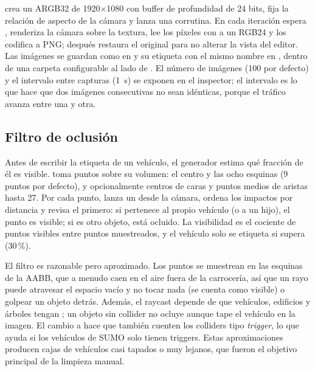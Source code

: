 \documentclass[11pt,a4paper]{article}
\begin{document}
 crea un  ARGB32 de 1920$\times$1080 con buffer de profundidad de 24 bits, fija la relación de aspecto de la cámara y lanza una corrutina. En cada iteración espera , renderiza la cámara sobre la textura, lee los píxeles con  a un  RGB24 y los codifica a PNG; después restaura el  original para no alterar la vista del editor. Las imágenes se guardan como  en  y su etiqueta con el mismo nombre en , dentro de una carpeta configurable al lado de . El número de imágenes (100 por defecto) y el intervalo entre capturas (1~s) se exponen en el inspector; el intervalo es lo que hace que dos imágenes consecutivas no sean idénticas, porque el tráfico avanza entre una y otra.

\subsection{Filtro de oclusión}

Antes de escribir la etiqueta de un vehículo, el generador estima qué fracción de él es visible.  toma puntos sobre su volumen: el centro y las ocho esquinas (9 puntos por defecto), y opcionalmente centros de caras y puntos medios de aristas hasta 27. Por cada punto,  lanza un  desde la cámara, ordena los impactos por distancia y revisa el primero: si pertenece al propio vehículo (o a un hijo), el punto es visible; si es otro objeto, está ocluido. La visibilidad es el cociente de puntos visibles entre puntos muestreados, y el vehículo solo se etiqueta si supera  (30\,\%).

El filtro es razonable pero aproximado. Los puntos se muestrean en las esquinas de la AABB, que a menudo caen en el aire fuera de la carrocería, así que un rayo puede atravesar el espacio vacío y no tocar nada (se cuenta como visible) o golpear un objeto detrás. Además, el raycast depende de que vehículos, edificios y árboles tengan ; un objeto sin collider no ocluye aunque tape el vehículo en la imagen. El cambio a  hace que también cuenten los colliders tipo \emph{trigger}, lo que ayuda si los vehículos de SUMO solo tienen triggers. Estas aproximaciones producen cajas de vehículos casi tapados o muy lejanos, que fueron el objetivo principal de la limpieza manual.
\end{document}
